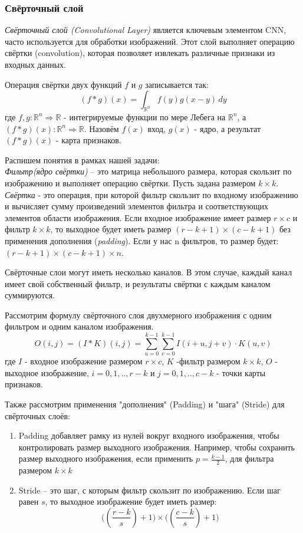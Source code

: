 \subsubsection{Свёрточный слой}
\par \textit{Свёрточный слой (Convolutional Layer)} является ключевым элементом CNN, часто используется для обработки изображений. Этот слой выполняет операцию свёртки (convolution), которая позволяет извлекать различные признаки из входных данных.
\par Операция свёртки двух функций $f$ и $g$ записывается так:
\begin{equation}
	(f*g)(x) = \int_{\mathbb{R}^n} f(y)g(x-y)\,dy
\end{equation}
где $f,g: \mathbb{R}^n \Rightarrow \mathbb{R}$ - интегрируемые функции по мере Лебега на $\mathbb{R}^n$, а $(f*g)(x): \mathbb{R}^n \Rightarrow \mathbb{R}$.
Назовём $f(x)$ вход, $g(x)$ - ядро, а результат $(f*g)(x)$ - карта признаков.
\par Распишем понятия в рамках нашей задачи:\\
\textit{Фильтр(ядро свёртки)} – это матрица небольшого размера, которая скользит по изображению и выполняет операцию свёртки. Пусть задана размером $k \times k$.
\textit{Свёртка} - это операция, при которой фильтр скользит по входному изображению и вычисляет сумму произведений элементов фильтра и соответствующих элементов области изображения. Если входное изображение имеет размер $r \times c$ и фильтр $k \times k$, то выходное будет иметь размер $(r-k+1) \times (c-k+1)$ без применения дополнения (\textit{padding}). Если у нас n фильтров, то размер будет: $(r-k+1) \times (c-k+1) \times n$.
\par Свёрточные слои могут иметь несколько каналов. В этом случае, каждый канал имеет свой собственный фильтр, и результаты свёртки с каждым каналом суммируются.
\par Рассмотрим формулу свёрточного слоя двухмерного изображения с одним фильтром и одним каналом изображения. \cite[327-331]{Goodfellow-et-al-2016}
\begin{equation}
	O(i,j) = (I*K)(i,j) = \sum_{u=0}^{k-1}\sum_{v=0}^{k-1}I(i+u, j+v) \cdot K(u,v)
\end{equation}
где $I$ - входное изображение размером $r \times c$, $K$ -фильтр размером $k \times k$, $O$ - выходное изображение, $i=0,1,.., r-k$ и $j=0,1,.., c-k$ - точки карты признаков.
\par Также рассмотрим применения "дополнения" (Padding) и "шага" (Stride) для свёрточных слоёв:
\begin{enumerate}[]
	\item Padding добавляет рамку из нулей вокруг входного изображения, чтобы контролировать размер выходного изображения. Например, чтобы сохранить размер выходного изображения, если применить $p = \frac{k-1}{2}$, для фильтра размером $k \times k$
	\item Stride – это шаг, с которым фильтр скользит по изображению. Если шаг равен 
	$s$, то выходное изображение будет иметь размер:
	\begin{equation}
		\Big((\frac{r-k}{s}) + 1\Big) \times \Big((\frac{c-k}{s}) + 1\Big) 
	\end{equation}
\end{enumerate}


